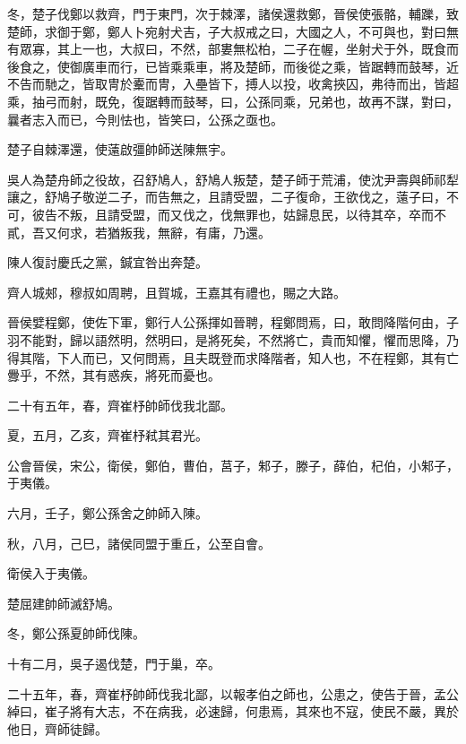 \begin{pinyinscope}
冬，楚子伐鄭以救齊，門于東門，次于棘澤，諸侯還救鄭，晉侯使張骼，輔躒，致楚師，求御于鄭，鄭人卜宛射犬吉，子大叔戒之曰，大國之人，不可與也，對曰無有眾寡，其上一也，大叔曰，不然，部婁無松柏，二子在幄，坐射犬于外，既食而後食之，使御廣車而行，已皆乘乘車，將及楚師，而後從之乘，皆踞轉而鼓琴，近不告而馳之，皆取冑於櫜而冑，入壘皆下，搏人以投，收禽挾囚，弗待而出，皆超乘，抽弓而射，既免，復踞轉而鼓琴，曰，公孫同乘，兄弟也，故再不謀，對曰，曩者志入而已，今則怯也，皆笑曰，公孫之亟也。

楚子自棘澤還，使薳啟彊帥師送陳無宇。

吳人為楚舟師之役故，召舒鳩人，舒鳩人叛楚，楚子師于荒浦，使沈尹壽與師祁犁讓之，舒鳩子敬逆二子，而告無之，且請受盟，二子復命，王欲伐之，薳子曰，不可，彼告不叛，且請受盟，而又伐之，伐無罪也，姑歸息民，以待其卒，卒而不貳，吾又何求，若猶叛我，無辭，有庸，乃還。

陳人復討慶氏之黨，鍼宜咎出奔楚。

齊人城郟，穆叔如周聘，且賀城，王嘉其有禮也，賜之大路。

晉侯嬖程鄭，使佐下軍，鄭行人公孫揮如晉聘，程鄭問焉，曰，敢問降階何由，子羽不能對，歸以語然明，然明曰，是將死矣，不然將亡，貴而知懼，懼而思降，乃得其階，下人而已，又何問焉，且夫既登而求降階者，知人也，不在程鄭，其有亡釁乎，不然，其有惑疾，將死而憂也。

二十有五年，春，齊崔杼帥師伐我北鄙。

夏，五月，乙亥，齊崔杼弒其君光。

公會晉侯，宋公，衛侯，鄭伯，曹伯，莒子，邾子，滕子，薛伯，杞伯，小邾子，于夷儀。

六月，壬子，鄭公孫舍之帥師入陳。

秋，八月，己巳，諸侯同盟于重丘，公至自會。

衛侯入于夷儀。

楚屈建帥師滅舒鳩。

冬，鄭公孫夏帥師伐陳。

十有二月，吳子遏伐楚，門于巢，卒。

二十五年，春，齊崔杼帥師伐我北鄙，以報孝伯之師也，公患之，使告于晉，孟公綽曰，崔子將有大志，不在病我，必速歸，何患焉，其來也不寇，使民不嚴，異於他日，齊師徒歸。


\end{pinyinscope}
